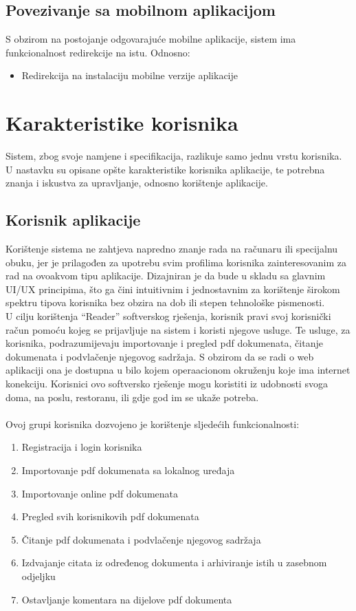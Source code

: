 \subsection{Povezivanje sa mobilnom aplikacijom}
S obzirom na postojanje odgovarajuće mobilne aplikacije, sistem ima funkcionalnost redirekcije na istu. Odnosno:
\begin{itemize}
  \item Redirekcija na instalaciju mobilne verzije aplikacije
\end{itemize}




\section{Karakteristike korisnika}
Sistem, zbog svoje namjene i specifikacija, razlikuje samo jednu vrstu korisnika. U nastavku su opisane opšte karakteristike korisnika aplikacije, te potrebna znanja i iskustva za upravljanje, odnosno korištenje aplikacije.


\subsection{Korisnik aplikacije}
Korištenje sistema ne zahtjeva napredno znanje rada na računaru ili specijalnu obuku, jer je prilagođen za upotrebu svim profilima korisnika zainteresovanim za rad na ovoakvom tipu aplikacije. Dizajniran je da bude u skladu sa glavnim UI/UX principima, što ga čini intuitivnim i jednostavnim za korištenje širokom spektru tipova korisnika bez obzira na dob ili stepen tehnološke pismenosti.  \\ U cilju korištenja “Reader” softverskog rješenja, korisnik pravi svoj korisnički račun pomoću kojeg se prijavljuje na sistem i koristi njegove usluge. Te usluge, za korisnika, podrazumijevaju importovanje i pregled pdf dokumenata, čitanje dokumenata i podvlačenje njegovog sadržaja. S obzirom da se radi o web aplikaciji ona je dostupna u bilo kojem operaacionom okruženju koje ima internet konekciju. Korisnici ovo softversko rješenje mogu koristiti iz udobnosti svoga doma, na poslu, restoranu, ili gdje god im se ukaže potreba.\\ \\ Ovoj grupi korisnika dozvojeno je korištenje sljedećih funkcionalnosti:
\begin{enumerate}
    \item Registracija i login korisnika
    \item Importovanje pdf dokumenata sa lokalnog uređaja
    \item Importovanje online pdf dokumenata
    \item Pregled svih korisnikovih pdf dokumenata
    \item Čitanje pdf dokumenata i podvlačenje njegovog sadržaja
    \item Izdvajanje citata iz određenog dokumenta i arhiviranje istih u zasebnom odjeljku
    \item Ostavljanje komentara na dijelove pdf dokumenta
\end{enumerate}

